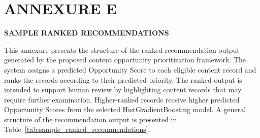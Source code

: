 \documentclass[12pt,a4paper]{report}
\begin{document}
\chapter*{ANNEXURE E}


\begin{center}
    \textbf{\Large SAMPLE RANKED RECOMMENDATIONS}
\end{center}

\vspace{0.5cm}

This annexure presents the structure of the ranked recommendation output generated by the proposed content opportunity prioritization framework. The system assigns a predicted Opportunity Score to each eligible content record and ranks the records according to their predicted priority. The ranked output is intended to support human review by highlighting content records that may require further examination. Higher-ranked records receive higher predicted Opportunity Scores from the selected HistGradientBoosting model. A general structure of the recommendation output is presented in Table~\ref{tab:sample_ranked_recommendations}.

\begin{table}[htbp]
\centering
\caption{Structure of the Ranked Recommendation Output}
\label{tab:sample_ranked_recommendations}
\renewcommand{\arraystretch}{1.3}
\end{table}
\end{document}
